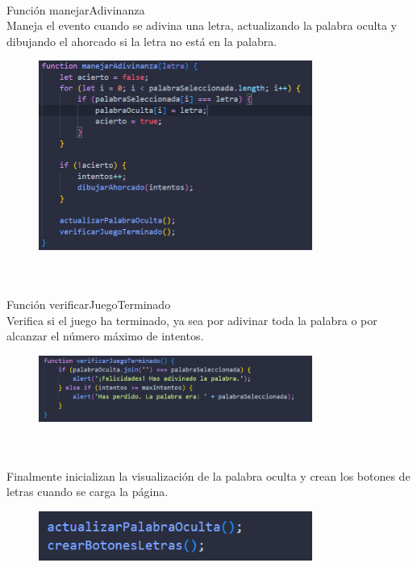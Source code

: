 \documentclass{article}
\begin{document}
\\Función manejarAdivinanza
\\Maneja el evento cuando se adivina una letra, actualizando la palabra oculta y dibujando el ahorcado si la letra no está en la palabra.
\begin{figure}[H]
		          \centering
		          \includegraphics[width=0.8\textwidth,keepaspectratio]                       {img/maneAh.png}
    \end{figure}  
\\

\\Función verificarJuegoTerminado
\\Verifica si el juego ha terminado, ya sea por adivinar toda la palabra o por alcanzar el número máximo de intentos.
\begin{figure}[H]
		          \centering
		          \includegraphics[width=0.8\textwidth,keepaspectratio]                       {img/veriAh.png}
    \end{figure}  
\\
\\Finalmente inicializan la visualización de la palabra oculta y crean los botones de letras cuando se carga la página.
\begin{figure}[H]
		          \centering
		          \includegraphics[width=0.8\textwidth,keepaspectratio]                       {img/lanzAh.png}
    \end{figure}  
\\
\end{document}
